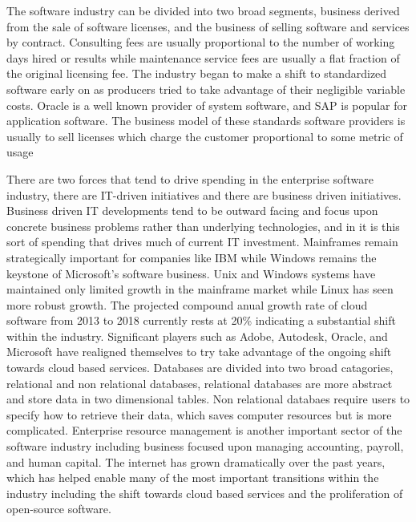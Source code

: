 The software industry can be divided into two broad segments, business derived from the sale of software licenses, and the business of selling software and services by contract.\autocite[]{ValuelineOverview}
Consulting fees are usually proportional to the number of working days hired or results while maintenance service fees are usually a flat fraction of the original licensing fee.\autocite[16]{buxmann2012software}
The industry began to make a shift to standardized software early on as producers tried to take advantage of their negligible variable costs.\autocite[14]{buxmann2012software}
Oracle is a well known provider of system software, and SAP is popular for application software. The business model of these standards software providers is usually to sell licenses which charge the customer proportional to some metric of usage\autocite[14]{buxmann2012software}

There are two forces that tend to drive spending in the enterprise software industry, there are IT-driven initiatives and there are business driven initiatives.\autocite[]{NextGenBusinessSoftware}
Business driven IT developments tend to be outward facing and focus upon concrete business problems rather than underlying technologies, and in it is this sort of spending that drives much of current IT investment.\autocite[]{NextGenBusinessSoftware}
Mainframes remain strategically important for companies like IBM while Windows remains the keystone of Microsoft's software business. Unix and Windows systems have maintained only limited growth in the mainframe market while Linux has seen more robust growth.\autocite[40]{SurveysSoftware2015}
The projected compound anual growth rate of cloud software from 2013 to 2018 currently rests at 20\% indicating a substantial shift within the industry. Significant players such as Adobe, Autodesk, Oracle, and Microsoft have realigned themselves to try take advantage of the ongoing shift towards cloud based services.\autocite[40]{SurveysSoftware2015}
Databases are divided into two broad catagories, relational and non relational databases, relational databases are more abstract and store data in two dimensional tables. Non relational databaes require users to specify how to retrieve their data, which saves computer resources but is more complicated.\autocite[45]{SurveysSoftware2015}
Enterprise resource management is another important sector of the software industry including business focused upon managing accounting, payroll, and human capital.\autocite[46]{SurveysSoftware2015}
The internet has grown dramatically over the past years, which has helped enable many of the most important transitions within the industry including the shift towards cloud based services and the proliferation of open-source software.\autocite[]{SurveysSoftware2015}
